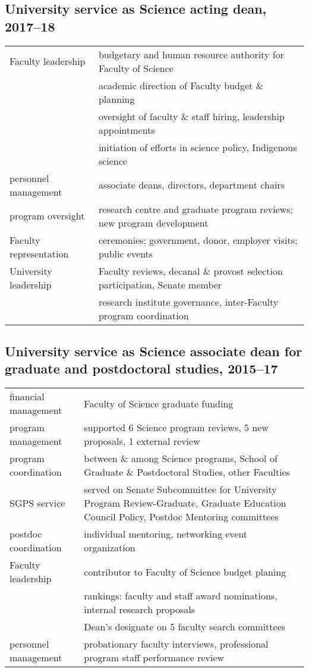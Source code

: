 \vspace{0.5cm}
\subsection{University service as Science acting dean, 2017--18}

\begin{tabularx}{\textwidth}{lX}
Faculty leadership & budgetary and human resource authority for Faculty of Science \\
& academic direction of Faculty budget \& planning   \\
& oversight of faculty \& staff hiring, leadership appointments \\
& initiation of efforts in science policy, Indigenous science \\
personnel management & associate deans, directors, department chairs \\
program oversight & research centre and graduate program reviews; new program development \\
Faculty representation & ceremonies; government, donor, employer visits; public events \\
University leadership  &  Faculty reviews, decanal \& provost selection participation, Senate member\\
 & research institute governance, inter-Faculty program coordination\\ 
\end{tabularx}

\vspace{0.5cm}
\subsection{University service as Science associate dean for graduate and postdoctoral studies, 2015--17}

\begin{tabularx}{\textwidth}{lX}
financial management & Faculty of Science graduate funding  \\
program management  & supported 6 Science program reviews,  5 new proposals, 1 external review \\
program coordination & between \& among Science programs, School of Graduate \& Postdoctoral Studies, other Faculties \\
SGPS  service &  served on Senate Subcommittee for University Program Review-Graduate, Graduate Education Council Policy, Postdoc Mentoring committees  \\
postdoc coordination & individual mentoring, networking event organization  \\ 
Faculty leadership & contributor to Faculty of Science budget planing  \\
& rankings: faculty and staff award nominations, internal research proposals  \\
& Dean's designate on 5 faculty search committees \\
personnel management & probationary faculty interviews, professional program staff performance review  \\
\end{tabularx}

